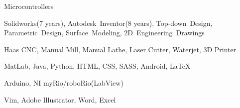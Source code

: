 \documentclass{resume}
\begin{document}
    \begin{skills}{Microcontrollers}

    \item [CAD] Solidworks(7 years), Autodesk~Inventor(8 years), Top-down~Design, Parametric~Design, Surface~Modeling, 2D~Engineering~Drawings
    \item [Manufacturing] Haas CNC, Manual Mill, Manual Lathe, Laser Cutter, Waterjet, 3D Printer
    \item [Programming] MatLab, Java, Python, HTML, CSS, SASS, Android, \LaTeX
    \item [Microcontrollers] Arduino, NI myRio/roboRio(LabView)
    \item [Software] Vim, Adobe Illustrator, Word, Excel
\end{skills}
  
\end{document}
